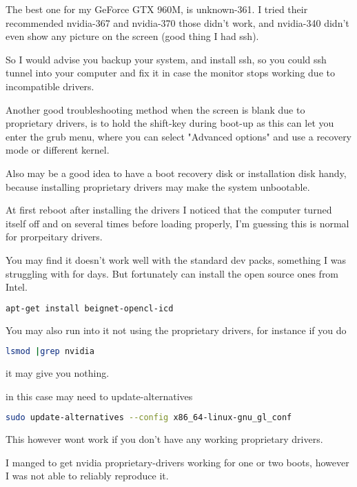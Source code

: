 \documentclass[12pt]{report}
\begin{document}
The best one for my GeForce GTX 960M, is unknown-361. I tried their recommended
nvidia-367 and nvidia-370 those didn't work, and nvidia-340 didn't even show any
picture on the screen (good thing I had ssh). 

So I would advise you backup your system, and install ssh, so you could ssh
tunnel into your computer and fix it in case the monitor stops working due to
incompatible drivers. 

Another good troubleshooting method when the screen is blank due to proprietary
drivers, is to hold the shift-key during boot-up as this can let you enter the
grub menu, where you can select "Advanced options" and use a recovery mode or
different kernel. 

Also may be a good idea to have a boot recovery disk or installation disk handy,
because installing proprietary drivers may make the system unbootable. 


At first reboot after installing the drivers I noticed that the computer turned
itself off and on several times before loading properly, I'm guessing this is
normal for prorpeitary drivers. 

You may find it doesn't work well with the standard dev packs, something I was
struggling with for days.  But fortunately can install the open source ones 
from Intel.

\begin{lstlisting}[language=bash]
apt-get install beignet-opencl-icd
\end{lstlisting}


You may also run into it not using the proprietary drivers, 
for instance if you do 
\begin{lstlisting}[language=bash]
lsmod |grep nvidia
\end{lstlisting}
it may give you nothing. 

in this case may need to update-alternatives
\begin{lstlisting}[language=bash]
sudo update-alternatives --config x86_64-linux-gnu_gl_conf
\end{lstlisting}

This however wont work if you don't have any working proprietary drivers. 

I manged to get nvidia proprietary-drivers working for one or two boots, however
I was not able to reliably reproduce it.
\end{document}
